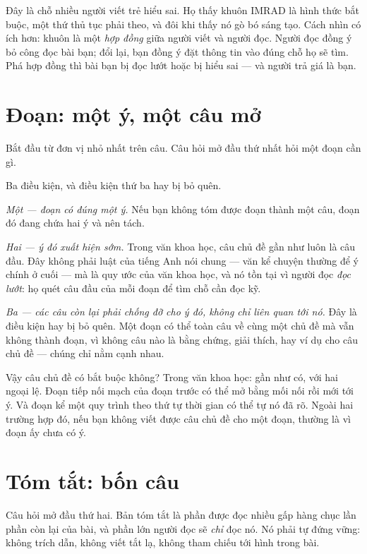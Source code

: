 \documentclass[../../english.tex]{subfiles}
\begin{document}
Đây là chỗ nhiều người viết trẻ hiểu sai. Họ thấy khuôn IMRAD là hình thức bắt buộc, một thứ thủ tục phải theo, và đôi khi thấy nó gò bó sáng tạo. Cách nhìn có ích hơn: khuôn là một \emph{hợp đồng} giữa người viết và người đọc. Người đọc đồng ý bỏ công đọc bài bạn; đổi lại, bạn đồng ý đặt thông tin vào đúng chỗ họ sẽ tìm. Phá hợp đồng thì bài bạn bị đọc lướt hoặc bị hiểu sai --- và người trả giá là bạn.

\section{Đoạn: một ý, một câu mở}

Bắt đầu từ đơn vị nhỏ nhất trên câu. Câu hỏi mở đầu thứ nhất hỏi một đoạn cần gì.

Ba điều kiện, và điều kiện thứ ba hay bị bỏ quên.

\emph{Một --- đoạn có đúng một ý.} Nếu bạn không tóm được đoạn thành một câu, đoạn đó đang chứa hai ý và nên tách.

\emph{Hai --- ý đó xuất hiện sớm.} Trong văn khoa học, câu chủ đề gần như luôn là câu đầu. Đây không phải luật của tiếng Anh nói chung --- văn kể chuyện thường để ý chính ở cuối --- mà là quy ước của văn khoa học, và nó tồn tại vì người đọc \emph{đọc lướt}: họ quét câu đầu của mỗi đoạn để tìm chỗ cần đọc kỹ.

\emph{Ba --- các câu còn lại phải \emph{chống đỡ} cho ý đó, không chỉ liên quan tới nó.} Đây là điều kiện hay bị bỏ quên. Một đoạn có thể toàn câu về cùng một chủ đề mà vẫn không thành đoạn, vì không câu nào là bằng chứng, giải thích, hay ví dụ cho câu chủ đề --- chúng chỉ nằm cạnh nhau.

Vậy câu chủ đề có bắt buộc không? Trong văn khoa học: gần như có, với hai ngoại lệ. Đoạn tiếp nối mạch của đoạn trước có thể mở bằng mối nối rồi mới tới ý. Và đoạn kể một quy trình theo thứ tự thời gian có thể tự nó đã rõ. Ngoài hai trường hợp đó, nếu bạn không viết được câu chủ đề cho một đoạn, thường là vì đoạn ấy chưa có ý.

\section{Tóm tắt: bốn câu}

Câu hỏi mở đầu thứ hai. Bản tóm tắt là phần được đọc nhiều gấp hàng chục lần phần còn lại của bài, và phần lớn người đọc sẽ \emph{chỉ} đọc nó. Nó phải tự đứng vững: không trích dẫn, không viết tắt lạ, không tham chiếu tới hình trong bài.
\end{document}
